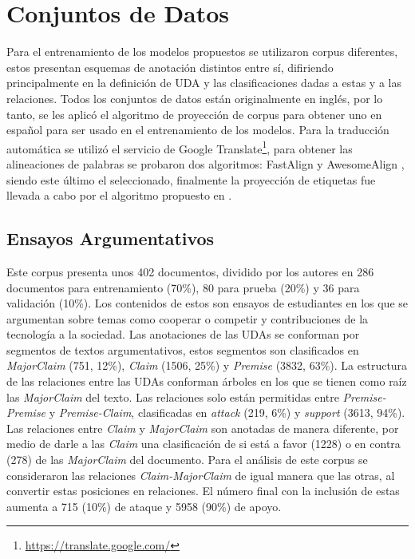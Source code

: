 \documentclass[a4paper,11pt,twocolumn,twoside]{article}
\begin{document}
\section{Conjuntos de Datos}

Para el entrenamiento de los modelos propuestos se utilizaron corpus diferentes, estos
presentan esquemas de anotación distintos entre sí, difiriendo principalmente en la definición de UDA y 
las clasificaciones dadas a estas y a las relaciones. 
Todos los conjuntos de datos están originalmente en inglés, por lo tanto, se les aplicó el algoritmo de proyección
de corpus para obtener uno en español para ser usado en el entrenamiento de los modelos. 
Para la traducción automática se utilizó el servicio de Google Translate\footnote{\url{https://translate.google.com/}}, 
para obtener las alineaciones de palabras se probaron dos algoritmos: FastAlign \cite{dyer2013fastalign} y AwesomeAlign 
\cite{dou2021word}, siendo este último el seleccionado, finalmente la proyección de etiquetas
fue llevada a cabo por el algoritmo propuesto en \cite{eger2018cross}.


\subsection{Ensayos Argumentativos}\label{corpus:persuasive_essays}

Este corpus \cite{stab2017parsing} presenta unos 402 documentos, dividido por los autores en 286 documentos para entrenamiento (70\%), 
80 para prueba (20\%) y 36 para validación (10\%). Los contenidos de estos son ensayos de estudiantes en los que 
se argumentan sobre temas como cooperar o competir y contribuciones de la tecnología a la sociedad.
Las anotaciones de las UDAs se conforman por segmentos de textos argumentativos, estos segmentos son 
clasificados en \textit{MajorClaim} (751, 12\%), \textit{Claim} (1506, 25\%) y \textit{Premise} (3832, 63\%).
La estructura de las relaciones entre las UDAs conforman árboles en los que se tienen como raíz las 
\textit{MajorClaim} del texto. Las relaciones solo están permitidas entre \textit{Premise-Premise} y \textit{Premise-Claim}, clasificadas
en \textit{attack} (219, 6\%) y \textit{support} (3613, 94\%). Las relaciones entre \textit{Claim} y \textit{MajorClaim} son anotadas 
de manera diferente, por medio de 
darle a las \textit{Claim} una clasificación de si está a favor (1228) o en contra (278) de las \textit{MajorClaim} del documento.
Para el análisis de este corpus se consideraron las relaciones \textit{Claim-MajorClaim} de igual manera que las otras,
al convertir estas posiciones en relaciones. El número final con la inclusión de estas aumenta a 715 (10\%) de ataque y 
5958 (90\%) de apoyo.
\end{document}
